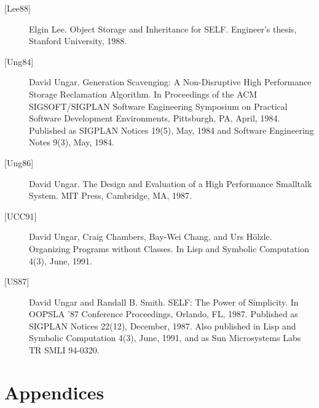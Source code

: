 \documentclass[letterpaper,10pt,english]{sphinxmanual}
\begin{document}
\begin{description}
\item[{{[}Lee88{]}}] \leavevmode
Elgin Lee. Object Storage and Inheritance for SELF. Engineer’s thesis, Stanford University, 1988.

\item[{{[}Ung84{]}}] \leavevmode
David Ungar. Generation Scavenging: A Non-Disruptive High Performance Storage Reclamation Algorithm. In Proceedings of the ACM SIGSOFT/SIGPLAN Software Engineering Symposium on Practical Software Development Environments, Pittsburgh, PA, April, 1984. Published as SIGPLAN Notices 19(5), May, 1984 and Software Engineering Notes 9(3), May, 1984.

\item[{{[}Ung86{]}}] \leavevmode
David Ungar. The Design and Evaluation of a High Performance Smalltalk System. MIT Press, Cambridge, MA, 1987.

\item[{{[}UCC91{]}}] \leavevmode
David Ungar, Craig Chambers, Bay-Wei Chang, and Urs Hölzle. Organizing Programs without Classes. In Lisp and Symbolic Computation 4(3), June, 1991.

\item[{{[}US87{]}}] \leavevmode
David Ungar and Randall B. Smith. SELF: The Power of Simplicity. In OOPSLA ’87 Conference Proceedings, Orlando, FL, 1987. Published as SIGPLAN Notices 22(12), December, 1987. Also published in Lisp and Symbolic Computation 4(3), June, 1991, and as Sun Microsystems Labs TR SMLI 94-0320.

\end{description}


\chapter{Appendices}
\label{\detokenize{appendices::doc}}\label{\detokenize{appendices:appendices}}
\end{document}
